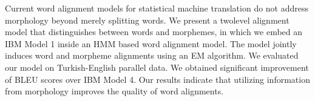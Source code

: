 Current word alignment models for statistical machine translation do not address morphology beyond
 merely splitting words. We present a twolevel
 alignment model that distinguishes between
 words and morphemes, in which we embed an
 IBM Model 1 inside an HMM based word alignment
 model. The model jointly induces word and
 morpheme alignments using an EM algorithm. We
 evaluated our model on Turkish-English parallel
 data. We obtained significant improvement of BLEU
 scores over IBM Model 4. Our results indicate that
 utilizing information from morphology improves the
 quality of word alignments.

